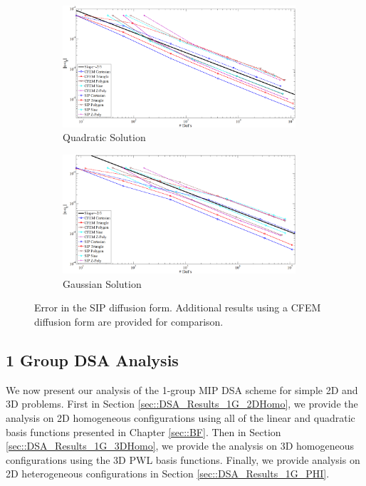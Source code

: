 \begin{figure}
\centering
{
	\begin{subfigure}[b]{0.95\textwidth}
		\centering
		\includegraphics[width=0.95\textwidth]{figures/sec_DSA/SIP_mms_3d_quad_full_paint.png}
		\caption{Quadratic Solution}
	\end{subfigure}
}
\vspace{3mm}
{
	\begin{subfigure}[b]{0.95\textwidth}
		\centering
		\includegraphics[width=0.95\textwidth]{figures/sec_DSA/SIP_mms_3d_gauss_full_paint.png}
		\caption{Gaussian Solution}
	\end{subfigure}
}
\caption{Error in the SIP diffusion form. Additional results using a CFEM diffusion form are provided for comparison.}
\label{fig::SIP_mms_error_plot}
\end{figure}


\subsection{1 Group DSA Analysis}
\label{sec::DSA_Results_1G}

We now present our analysis of the 1-group MIP DSA scheme for simple 2D and 3D problems. First in Section \ref{sec::DSA_Results_1G_2DHomo}, we provide the analysis on 2D homogeneous configurations using all of the linear and quadratic basis functions presented in Chapter \ref{sec::BF}. Then in Section \ref{sec::DSA_Results_1G_3DHomo}, we provide the analysis on 3D homogeneous configurations using the 3D PWL basis functions. Finally, we provide analysis on 2D heterogeneous configurations in Section \ref{sec::DSA_Results_1G_PHI}.

